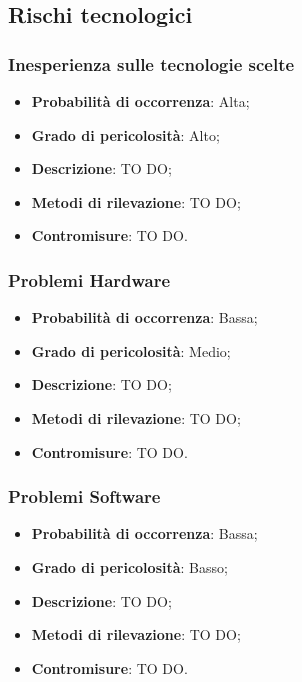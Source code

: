 	\subsection{Rischi tecnologici} %
	\label{sub:rischi_tecnologici}
		\subsubsection{Inesperienza sulle tecnologie scelte} %
		\label{ssub:inesperienza_sulle_tecnlogie_scelte}
			\begin{itemize}
				\item \textbf{Probabilità di occorrenza}: Alta;
				\item \textbf{Grado di pericolosità}: Alto;
				\item \textbf{Descrizione}: TO DO;
				\item \textbf{Metodi di rilevazione}: TO DO;
				\item \textbf{Contromisure}: TO DO.
			\end{itemize}
		
		\subsubsection{Problemi Hardware} %
		\label{ssub:problemi_hardware}
			\begin{itemize}
				\item \textbf{Probabilità di occorrenza}: Bassa;
				\item \textbf{Grado di pericolosità}: Medio;
				\item \textbf{Descrizione}: TO DO;
				\item \textbf{Metodi di rilevazione}: TO DO;
				\item \textbf{Contromisure}: TO DO.
			\end{itemize}
		
		\subsubsection{Problemi Software} %
		\label{ssub:problemi_software}
			\begin{itemize}
				\item \textbf{Probabilità di occorrenza}: Bassa;
				\item \textbf{Grado di pericolosità}: Basso;
				\item \textbf{Descrizione}: TO DO;
				\item \textbf{Metodi di rilevazione}: TO DO;
				\item \textbf{Contromisure}: TO DO.
			\end{itemize}
		
